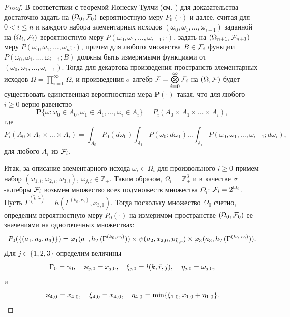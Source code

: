 \documentclass[a4paper,12pt,russian]{extarticle}
\newcommand{\G}{\Gamma}
\newcommand{\ga}[1]{\Gamma^{\left( #1 \right)} }
\renewcommand{\Pr}{{\mathbf P}}
\begin{document}
\begin{proof}
В соответствии с теоремой Ионеску Тулчи (см. \cite{Shiryaev}) для доказательства достаточно задать на $(\Omega_0, {\cal F}_0)$ вероятностную меру $P_0(\cdot)$ и далее, считая для $0 < i \leqslant n$ и каждого набора элементарных исходов $(\omega_0, \omega_1, \ldots, \omega_{i-1})$ заданной на $(\Omega_i, {\cal F}_i)$ вероятностную меру $P(\omega_0,\omega_1,\ldots, \omega_{i-1};\cdot)$, задать на $(\Omega_{n+1}, {\cal F}_{n+1})$ меру $P(\omega_0,\omega_1,\ldots, \omega_{n};\cdot)$, причем для любого множества $B\in {\cal F}_i$ функции $P(\omega_0,\omega_1,\ldots, \omega_{i-1};B)$
должны быть измеримыми функциями от $(\omega_0, \omega_1, \ldots, \omega_{i-1})$. Тогда для декартова произведения пространств элементарных исходов $\Omega=\prod\limits_{i=0}^{\infty}\Omega_i$ и произведения $\sigma$-алгебр ${\cal F}=\bigotimes\limits_{i=0}^{\infty} {\cal F}_i$ на $(\Omega,{\cal F})$ будет существовать единственная вероятностная мера $\Pr(\cdot)$ такая, что для любого $i \geqslant 0$ верно равенство
\begin{equation}
\Pr\{\omega \colon \omega_0 \in A_0, \omega_1 \in A_1, \ldots, \omega_i\in A_i\} = P_i(A_0 \times A_1 \times \ldots \times A_i),
\label{ProbabilitiesGeneral}
\end{equation}
где 
\begin{equation}
 P_i(A_0 \times A_1 \times \ldots \times A_i) = \int_{A_0} P_0(d \omega_0) \int_{A_1} P(\omega_0;d \omega_1) \ldots \int_{A_i} P(\omega_0, \omega_1, \ldots, \omega_{i-1}; d \omega_i),
\label{ProbabilitiesGeneralOne}
\end{equation}
для любого $A_i$ из ${\cal F}_i$. 

Итак, за описание элементарного исхода $\omega_i \in \Omega_i$ для произвольного $i \geqslant 0$ примем набор $(\omega_{1,i},\omega_{2,i},\omega_{3,i})$, $\omega_{j,i}\in \mathbb{Z}_+$. Таким образом, $\Omega_i=\mathbb{Z}_+^3$ и в качестве $\sigma$-алгебры ${\cal F}_i$ возьмем множество всех подмножеств множества $\Omega_i$: ${\cal F}_i=2^{\Omega_i}$. Пусть $\ga{\tilde{k},\tilde{r}}=h(\ga{k_0,r_0},x_{3,0})$. Тогда  поскольку множество $\Omega_0$ счетно, определим вероятностную меру $P_0(\cdot)$ на измеримом пространстве $(\Omega_0,{\cal F}_0)$ ее значениями на одноточечных множествах:
\begin{equation}
P_0(\{(a_1,a_2,a_3)\})=\vp_1(a_1,h_T(\ga{k_0,r_0})) \times \psi(a_2,x_{2,0}, p_{\tilde{k},\tilde{r}}) \times \vp_3(a_3,h_T(\ga{k_0,r_0})).
\label{probabilitiesOne}
\end{equation}
Для $j\in \{1,2,3\}$ определим величины
\begin{equation}
\G_0=\gamma_0, \quad \vk_{j,0}=x_{j,0}, \quad \xi_{j,0}=l(\tilde{k},\tilde{r},j), \quad \eta_{j,0}=\omega_{j,0},
\label{startRekOne}
\end{equation}
и
\begin{equation}
 \varkappa_{4,0}=x_{4,0}, \quad \xi_{4,0}=x_{4,0}, \quad \eta_{4,0}=\min\{\xi_{1,0}, x_{1,0}+\eta_{1,0}\}.
\label{startRekTwo}
\end{equation}


\end{proof}
\end{document}
